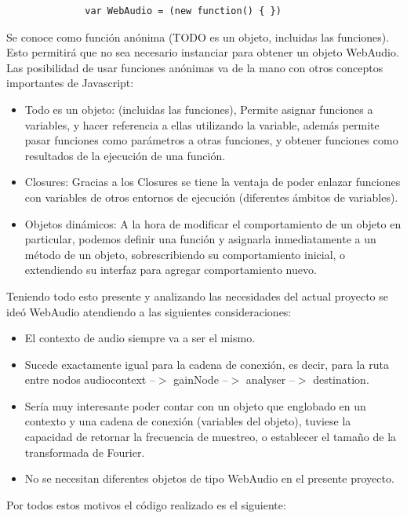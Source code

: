 \begin{verbatim}
              var WebAudio = (new function() { })
\end{verbatim}

Se conoce como función anónima (TODO es un objeto, incluidas las funciones). Esto permitirá que no sea necesario instanciar para obtener un objeto WebAudio. 
Las posibilidad de usar funciones anónimas va de la mano con otros conceptos importantes de Javascript:

\begin{itemize}
 \item Todo es un objeto: (incluidas las funciones), Permite asignar funciones a variables, y hacer referencia a ellas utilizando la variable, además permite pasar funciones como parámetros a otras funciones, y obtener funciones como resultados de la ejecución de una función. 
 \item Closures: Gracias a los Closures se tiene la ventaja de poder enlazar funciones con variables de otros entornos de ejecución (diferentes ámbitos de variables).
 \item Objetos dinámicos: A la hora de modificar el comportamiento de un objeto en particular, podemos definir una función y asignarla inmediatamente a un método de un objeto, sobrescribiendo su comportamiento inicial, o extendiendo su interfaz para agregar comportamiento nuevo.
\end{itemize}

Teniendo todo esto presente y analizando las necesidades del actual proyecto se ideó WebAudio atendiendo a las siguientes consideraciones:

\begin{itemize}
 \item El contexto de audio siempre va a ser el mismo. 
 \item Sucede exactamente igual para la cadena de conexión, es decir, para la ruta entre nodos audiocontext --$>$ gainNode --$>$ analyser --$>$ destination. 
 \item Sería muy interesante poder contar con un objeto que englobado en un contexto y una cadena de conexión (variables del objeto), tuviese la capacidad de retornar la frecuencia de muestreo, o establecer el tamaño de la transformada de Fourier. 
 \item No se necesitan diferentes objetos de tipo WebAudio en el presente proyecto.
\end{itemize}

Por todos estos motivos el código realizado es el siguiente:

